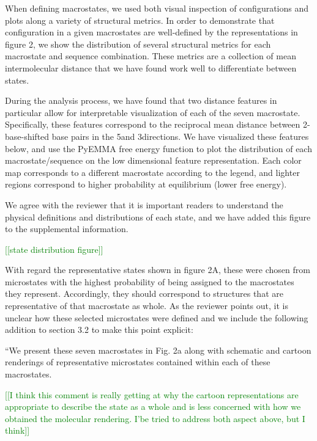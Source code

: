 \documentclass[11pt,a4paper]{letter} %
\newcommand*{\rood}[1]{{\color{red}{#1}}}
\newcommand*{\noteg}[1]{\textcolor{green}{[[#1]]}}		%
\begin{document}
When defining macrostates, we used both visual inspection of configurations and plots along a variety of structural metrics. In order to demonstrate that configuration in a given macrostates are well-defined by the representations in figure 2, we show the distribution of several structural metrics for each macrostate and sequence combination. These metrics are a collection of mean intermolecular distance that we have found work well to differentiate between states. 

During the analysis process, we have found that two distance features in particular allow for interpretable visualization of each of the seven macrostate. Specifically, these features correspond to the reciprocal mean distance between 2-base-shifted base pairs in the 5\prime and 3\prime directions. We have visualized these features below, and use the PyEMMA free energy function to plot the distribution of each macrostate/sequence on the low dimensional feature representation. Each color map corresponds to a different macrostate according to the legend, and lighter regions correspond to higher probability at equilibrium (lower free energy).

We agree with the reviewer that it is important readers to understand the physical definitions and distributions of each state, and we have added this figure to the supplemental information.

\noteg{state distribution figure}

With regard the representative states shown in figure 2A, these were chosen from microstates with the highest probability of being assigned to the macrostates they represent. Accordingly, they should correspond to structures  that are representative of that macrostate as whole. As the reviewer points out, it is unclear how these selected microstates were defined and we include the following addition to section 3.2 to make this point explicit:

``We present these seven macrostates in Fig. 2a along with schematic and cartoon renderings of representative microstates contained within each of these macrostates. \rood{Molecular renderings were sampled from microstates with the highest probability of being clustered into their respective PCCA+ macrostates and should therefore reflect the macrostate population as whole''}

\noteg{I think this comment is really getting at why the cartoon representations are appropriate to describe the state as a whole and is less concerned with how we obtained the molecular rendering. I'be tried to address both aspect above, but I think}
\end{document}
